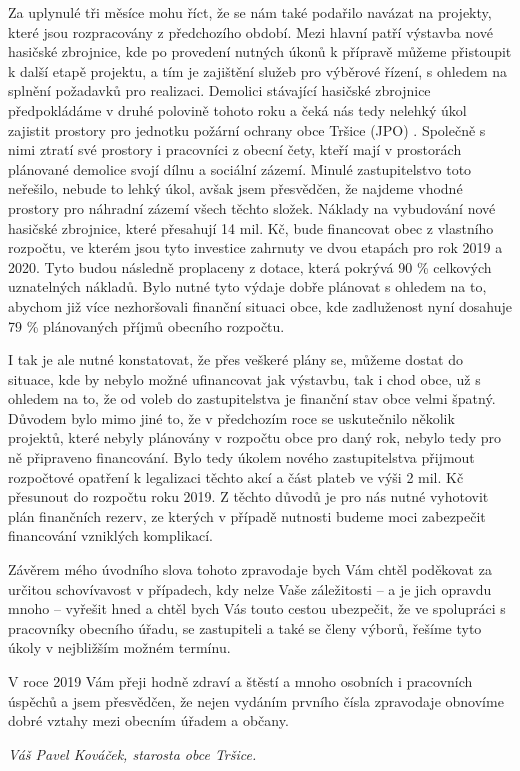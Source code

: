 \documentclass[10pt]{article}
\begin{document}
\begin{multicols}{3}
{Za uplynulé tři měsíce mohu říct, že se nám také podařilo navázat na projekty, které jsou rozpracovány z předchozího období. Mezi hlavní patří výstavba nové hasičské zbrojnice, kde po provedení nutných úkonů k přípravě můžeme přistoupit k další etapě projektu, a tím je zajištění služeb pro výběrové řízení, s ohledem na splnění požadavků pro realizaci. Demolici stávající hasičské zbrojnice předpokládáme v druhé polovině tohoto roku a čeká nás tedy nelehký úkol zajistit prostory pro jednotku požární ochrany obce Tršice (JPO) . Společně s nimi ztratí své prostory i pracovníci z obecní čety, kteří mají v prostorách plánované demolice svojí dílnu a sociální zázemí. Minulé zastupitelstvo toto neřešilo, nebude to lehký úkol, avšak jsem přesvědčen, že najdeme vhodné prostory pro náhradní zázemí všech těchto složek. Náklady na vybudování nové hasičské zbrojnice, které přesahují 14 mil. Kč, bude financovat obec z vlastního rozpočtu, ve kterém jsou tyto investice zahrnuty ve dvou etapách pro rok 2019 a 2020. Tyto budou následně proplaceny z dotace, která pokrývá 90 \% celkových uznatelných nákladů. Bylo nutné tyto výdaje dobře plánovat s ohledem na to, abychom již více nezhoršovali finanční situaci obce, kde zadluženost nyní dosahuje 79 \% plánovaných příjmů obecního rozpočtu.

I tak je ale nutné konstatovat, že přes veškeré plány se, můžeme dostat do situace, kde by nebylo možné ufinancovat jak výstavbu, tak i chod obce, už s ohledem na to, že od voleb do zastupitelstva je finanční stav obce velmi špatný. Důvodem bylo mimo jiné to, že v předchozím roce se uskutečnilo několik projektů, které nebyly plánovány v rozpočtu obce pro daný rok, nebylo tedy pro ně připraveno financování. Bylo tedy úkolem nového zastupitelstva přijmout rozpočtové opatření k legalizaci těchto akcí a část plateb ve výši 2 mil. Kč přesunout do rozpočtu roku 2019. Z těchto důvodů je pro nás nutné vyhotovit plán finančních rezerv, ze kterých v případě nutnosti budeme moci zabezpečit financování vzniklých komplikací.

Závěrem mého úvodního slova tohoto zpravodaje bych Vám chtěl poděkovat za určitou schovívavost v případech, kdy nelze Vaše záležitosti – a je jich opravdu mnoho – vyřešit hned a chtěl bych Vás touto cestou ubezpečit, že ve spolupráci s pracovníky obecního úřadu, se zastupiteli a také se členy výborů, řešíme tyto úkoly v nejbližším možném termínu.

V roce 2019 Vám přeji hodně zdraví a štěstí a mnoho osobních i pracovních úspěchů a jsem přesvědčen, že nejen vydáním prvního čísla zpravodaje obnovíme dobré vztahy mezi obecním úřadem a občany.

\emph{Váš Pavel Kováček, starosta obce Tršice.}
}\end{multicols}
\end{document}
